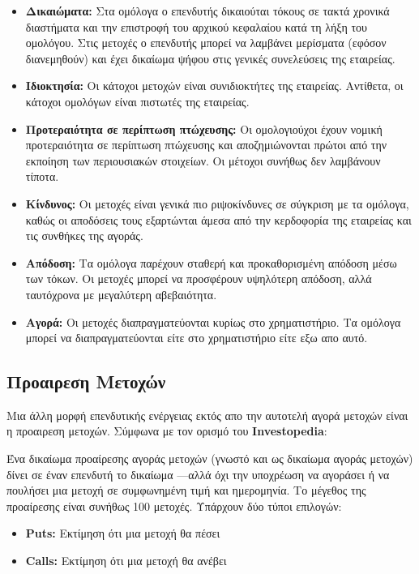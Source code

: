 \begin{itemize}
    \item \textbf{Δικαιώματα:} Στα ομόλογα ο επενδυτής δικαιούται τόκους σε τακτά χρονικά διαστήματα και την επιστροφή του αρχικού κεφαλαίου κατά τη λήξη του ομολόγου.
    Στις μετοχές ο επενδυτής μπορεί να λαμβάνει μερίσματα (εφόσον διανεμηθούν) και έχει δικαίωμα ψήφου στις γενικές συνελεύσεις της εταιρείας.
    \item \textbf{Ιδιοκτησία:} Οι κάτοχοι μετοχών είναι συνιδιοκτήτες της εταιρείας. Αντίθετα, οι κάτοχοι ομολόγων είναι πιστωτές της εταιρείας.
    \item \textbf{Προτεραιότητα σε περίπτωση πτώχευσης:} Οι ομολογιούχοι έχουν νομική προτεραιότητα σε περίπτωση πτώχευσης και αποζημιώνονται πρώτοι από την εκποίηση 
    των περιουσιακών στοιχείων. Οι μέτοχοι συνήθως δεν λαμβάνουν τίποτα.
    \item \textbf{Κίνδυνος:} Οι μετοχές είναι γενικά πιο ριψοκίνδυνες σε σύγκριση με τα ομόλογα, καθώς οι αποδόσεις τους εξαρτώνται άμεσα 
    από την κερδοφορία της εταιρείας και τις συνθήκες της αγοράς.
    \item \textbf{Απόδοση:} Τα ομόλογα παρέχουν σταθερή και προκαθορισμένη απόδοση μέσω των τόκων. Οι μετοχές μπορεί να προσφέρουν υψηλότερη απόδοση, αλλά ταυτόχρονα με μεγαλύτερη αβεβαιότητα.
    \item \textbf{Αγορά:} Οι μετοχές διαπραγματεύονται κυρίως στο χρηματιστήριο. Τα ομόλογα μπορεί να διαπραγματεύονται είτε στο χρηματιστήριο είτε εξω απο αυτό.
\end{itemize}

\subsection{Προαιρεση Μετοχών}

Μια άλλη μορφή επενδυτικής ενέργειας εκτός απο την αυτοτελή αγορά μετοχών είναι η προαιρεση μετοχών.
Σύμφωνα με τον ορισμό του \textbf{Investopedia}:
\begin{tcolorbox}[colframe=blue!50!black, colback=blue!5, title=Ορισμός Προαιρεσης Μετοχών]
    Ένα δικαίωμα προαίρεσης αγοράς μετοχών (γνωστό και ως δικαίωμα αγοράς μετοχών) 
    δίνει σε έναν επενδυτή το δικαίωμα —αλλά όχι την υποχρέωση να αγοράσει ή να πουλήσει 
    μια μετοχή σε συμφωνημένη τιμή και ημερομηνία. Το μέγεθος της προαίρεσης είναι συνήθως 100 μετοχές. 
    Υπάρχουν δύο τύποι επιλογών:
    \begin{itemize}
        \item \textbf{Puts:} Εκτίμηση ότι μια μετοχή θα πέσει
        \item \textbf{Calls:} Εκτίμηση ότι μια μετοχή θα ανέβει
    \end{itemize}
\end{tcolorbox}


